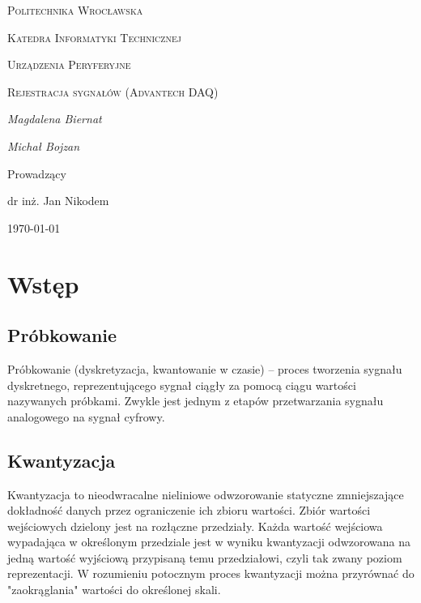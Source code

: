 \documentclass[12pt]{article}
\begin{document}
	
	\begin{titlepage}
		\centering
		{\scshape\LARGE Politechnika Wrocławska \par}
		{\scshape\Large Katedra Informatyki Technicznej\par}
		
		\vspace{1.5cm}
		{\scshape\Large Urządzenia Peryferyjne \par}
		\vspace{1.5cm}
		{\scshape\Huge Rejestracja sygnałów (Advantech DAQ)}
		\vspace{1.5cm}
	
		\vspace{2cm}
		{\Large\itshape Magdalena Biernat\par}
		{\Large\itshape Michał Bojzan \par}
		\vfill\flushleft\large
	
		
		\normalsize	\centering	\vspace{3cm}
		Prowadzący\par
		dr inż. Jan Nikodem 

		\vfill
		{\large \today\par}
	\end{titlepage}

	\newpage
\section{Wstęp}
\subsection{Próbkowanie}
Próbkowanie (dyskretyzacja, kwantowanie w czasie) – proces tworzenia sygnału dyskretnego, reprezentującego sygnał ciągły za pomocą ciągu wartości nazywanych próbkami. Zwykle jest jednym z etapów przetwarzania sygnału analogowego na sygnał cyfrowy.
\subsection{Kwantyzacja}
Kwantyzacja to nieodwracalne nieliniowe odwzorowanie statyczne zmniejszające dokładność danych przez ograniczenie ich zbioru wartości. Zbiór wartości wejściowych dzielony jest na rozłączne przedziały. Każda wartość wejściowa wypadająca w określonym przedziale jest w wyniku kwantyzacji odwzorowana na jedną wartość wyjściową przypisaną temu przedziałowi, czyli tak zwany poziom reprezentacji. W rozumieniu potocznym proces kwantyzacji można przyrównać do "zaokrąglania" wartości do określonej skali.
\end{document}
